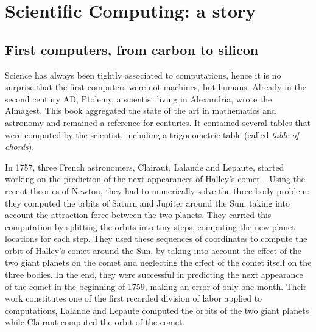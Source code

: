 \chapter{Scientific Computing: a story}
\label{chapter:context}

    \section{First computers, from carbon to silicon}%
    \label{sec:first_computers}

        Science has always been tightly associated to computations, hence it is no surprise that the first computers
        were not machines, but humans. Already in the second century AD, Ptolemy, a scientist living in Alexandria,
        wrote the Almagest. This book aggregated the state of the art in mathematics and astronomy and remained a
        reference for centuries. It contained several tables that were computed by the scientist, including a
        trigonometric table (called \emph{table of chords}).

        In 1757, three French astronomers, Clairaut, Lalande and Lepaute, started working on the prediction of the next
        appearances of Halley's comet~\cite[Chapter~1]{human_computers}. Using the recent theories of Newton, they had
        to numerically solve the three-body problem: they computed the orbits of Saturn and Jupiter around the Sun,
        taking into account the attraction force between the two planets. They carried this computation by splitting the
        orbits into tiny steps, computing the new planet locations for each step. They used these sequences of coordinates
        to compute the orbit of Halley's comet around the Sun, by taking into account the effect of the two giant
        planets on the comet and neglecting the effect of the comet itself on the three bodies. In the end, they were successful in
        predicting the next appearance of the comet in the beginning of 1759, making an error of only one month. Their
        work constitutes one of the first recorded division of labor applied to computations, Lalande and Lepaute
        computed the orbits of the two giant planets while Clairaut computed the orbit of the comet.


